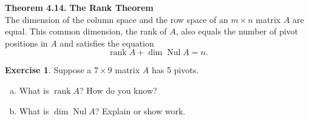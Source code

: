 \documentclass[10pt]{book}
\newcommand{\boxcolor}{gray!30}
\newenvironment{boxthm}{\begin{mdframed}[backgroundcolor=\boxcolor,nobreak=true]}{\end{mdframed}}
\theoremstyle{definition}
\newtheorem{exercise}{Exercise}[section]
\DeclareMathOperator{\Nul}{Nul}
\DeclareMathOperator{\rank}{rank}
\begin{document}
\newpage


\begin{boxthm}
	\textbf{Theorem 4.14.}
	\textbf{The Rank Theorem} \\
	The dimension of the column space and the row space of an $m\times n$ matrix $A$ are equal. This common dimension, the rank of $A$, also equals the number of pivot positions in $A$ and satisfies the equation
	\vspace{-1em}
	$$ \rank A + \dim\Nul A = n. $$
\end{boxthm}

\begin{exercise} %
	Suppose a $7\times 9$ matrix $A$ has 5 pivots.
	\begin{multicols}{2}
		\begin{enumerate}[(a)]
			\item What is $\rank A$? How do you know?
			\item What is $\dim\Nul A$? Explain or show work.
		\end{enumerate}
	\end{multicols}
\end{exercise}
\vspace{1.5in}
\end{document}
